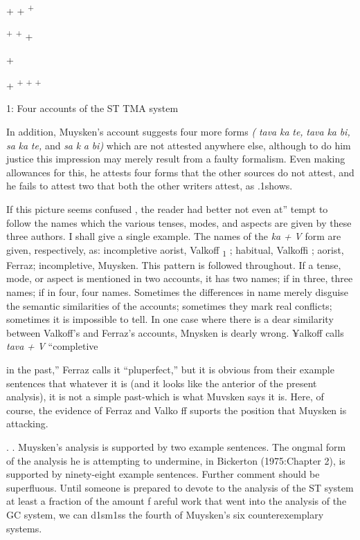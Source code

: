 + + \textsuperscript{+}

\textsuperscript{+ }\textsuperscript{+ }+

+

+ \textsuperscript{+ + +}

\begin{table}
\caption{1: Four accounts of the ST TMA system}
\label{tab:2}
\end{table}

In addition, Muysken's account suggests four more forms \textit{(} \textit{tava} \textit{ka} \textit{te,} \textit{tava} \textit{ka} \textit{bi,} \textit{sa} \textit{ka} \textit{te,} and \textit{sa} \textit{k} \textit{a} \textit{bi}\textit{)} which are not attested anywhere else, although to do him justice this impression may merely result from a faulty formalism. Even making allowances for this, he attests four forms that the other sources do not attest, and he fails to attest two that both the other writers attest, as .1shows.

If this picture seems confused , the reader had better not even at'' tempt to follow the names which the various tenses, modes, and aspects are given by these three authors. I shall give a single example. The names of the \textit{ka} \textit{+} \textit{V} form are given, respectively, as: incompletive aorist, Valkoff \textsubscript{1}\textsubscript{ }; habitual, Valkoffi ; aorist, Ferraz; incompletive, Muysken. This pattern is followed throughout. If a tense, mode, or aspect is mentioned in two accounts, it has two names; if in three, three names; if in four, four names. Sometimes the differences in name merely disguise the semantic similarities of the accounts; sometimes they mark real conflicts; sometimes it is impossible to tell. In one case where there is a dear similarity between Valkoff's and Ferraz's accounts, Mnysken is dearly wrong. ¥alkoff calls \textit{tava} \textit{+} \textit{V} ``completive


in the past,'' Ferraz calls it ``pluperfect,'' but it is obvious from their example sentences that whatever it is (and it looks like the anterior of the present analysis), it is not a simple past-which is what Muvsken says it is. Here, of course, the evidence of Ferraz and Valko ff suports the position that Muysken is attacking.

. . Muysken's analysis is supported by two example sentences. The ongmal form of the analysis he is attempting to undermine, in Bicker\-ton (1975:Chapter 2), is supported by ninety-eight example sentences. Further comment should be superfluous. Until someone is prepared to devote to the analysis of the ST system at least a fraction of the amount f areful work that went into the analysis of the GC system, we can d1sm1ss the fourth of Muysken's six counterexemplary systems.

